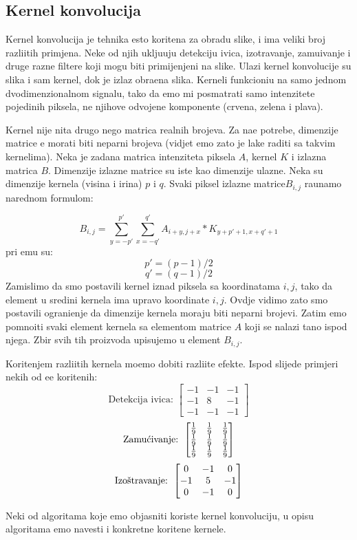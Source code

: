 \subsection{Kernel konvolucija} %
Kernel konvolucija je tehnika \ch esto kori\sh tena za obradu slike, i ima veliki broj razli\ch itih primjena. Neke od njih uklju\ch uju detekciju ivica, izo\sh travanje, zamu\cj ivanje i druge razne filtere koji mogu biti primijenjeni
na slike. Ulazi kernel konvolucije su slika i sam kernel, dok je izlaz obra\dj ena slika. Kerneli funkcioni\sh u na samo jednom dvodimenzionalnom signalu, tako da \cj emo mi posmatrati samo intenzitete pojedinih piksela, 
ne njihove odvojene komponente (crvena, zelena i plava).

Kernel nije ni\sh ta drugo nego matrica realnih brojeva. Za na\sh e potrebe, dimenzije matrice \cj e morati biti neparni brojeva (vidjet \cj emo za\sh to je lak\sh e raditi sa takvim kernelima). Neka je zadana matrica intenziteta
piksela $A$, kernel $K$ i izlazna matrica $B$. Dimenzije izlazne matrice su iste kao dimenzije ulazne. Neka su dimenzije kernela (visina i \sh irina) $p$ i $q$. Svaki piksel izlazne matrice$B_{i,j}$ ra\ch unamo narednom formulom:

\[
B_{i,j}=\sum_{y=-p'}^{p'}\sum_{x=-q'}^{q'}A_{i+y,j+x}*K_{y+p'+1,x+q'+1} %
\]
pri \ch emu su:
\[
p'=(p-1)/2
\]
\[
q'=(q-1)/2
\]
Zamislimo da smo postavili kernel iznad piksela sa koordinatama $i,j$, tako da element u sredini kernela ima upravo koordinate $i,j$. Ovdje vidimo za\sh to smo postavili ograni\ch enje da dimenzije kernela moraju biti neparni brojevi.
Zatim \cj emo pomno\zh iti svaki element kernela sa elementom matrice $A$ koji se nalazi ta\ch no ispod njega. Zbir svih tih proizvoda upisujemo u element $B_{i,j}$.

Kori\sh tenjem razli\ch itih kernela mo\zh emo dobiti razli\ch ite efekte. Ispod slijede primjeri nekih od \ch e\sh \cj e kori\sh tenih:
\vspace{10px} %
\[
\text{Detekcija ivica: } 
\begin{bmatrix}
-1 & -1 & -1 \\
-1 &  8 & -1 \\
-1 & -1 & -1
\end{bmatrix}
\]
\vspace{5px}
\[
\text{Zamu\'{c}ivanje: } 
\begin{bmatrix}
\frac{1}{9} & \frac{1}{9} & \frac{1}{9} \\
\frac{1}{9} &  \frac{1}{9} &\frac{1}{9} \\
\frac{1}{9} & \frac{1}{9} & \frac{1}{9}
\end{bmatrix}
\]
\vspace{5px}
\[
\text{Izo\sh travanje: } 
\begin{bmatrix}
0  & -1 &  0 \\
-1 &  5 & -1 \\
 0 & -1 &  0
\end{bmatrix}
\]

Neki od algoritama koje \cj emo objasniti koriste kernel konvoluciju, u opisu algoritama \cj emo navesti i konkretne kori\sh tene kernele.